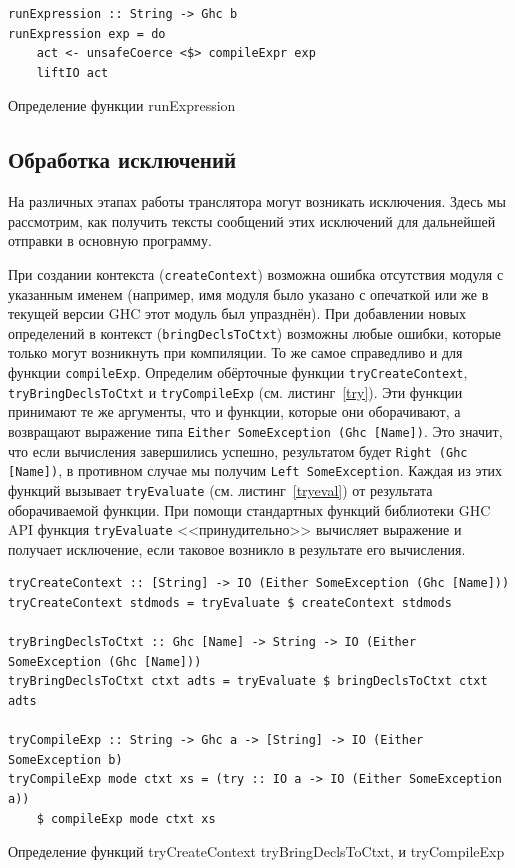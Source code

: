 \begin{ListingEnv}
	\begin{lstlisting}
runExpression :: String -> Ghc b
runExpression exp = do
    act <- unsafeCoerce <$> compileExpr exp
    liftIO act
	\end{lstlisting}
	\caption{Определение функции runExpression}\label{runexp}
\end{ListingEnv}
	
	\subsection{Обработка исключений}
	На различных этапах работы транслятора могут возникать исключения. Здесь мы рассмотрим, как получить тексты сообщений этих исключений для дальнейшей отправки в основную программу.
	
	При создании контекста (\lstinline!createContext!) возможна ошибка отсутствия модуля с указанным именем (например, имя модуля было указано с опечаткой или же в текущей версии GHC этот модуль был упразднён). При добавлении новых определений в контекст (\lstinline!bringDeclsToCtxt!) возможны любые ошибки, которые только могут возникнуть при компиляции. То же самое справедливо и для функции \lstinline!compileExp!. Определим обёрточные функции \lstinline!tryCreateContext!, \lstinline!tryBringDeclsToCtxt! и \lstinline!tryCompileExp! (см. листинг~\ref{try}). Эти функции принимают те же аргументы, что и функции, которые они оборачивают, а возвращают выражение типа \lstinline!Either SomeException (Ghc [Name])!. Это значит, что если вычисления завершились успешно, результатом будет \lstinline!Right (Ghc [Name])!, в противном случае мы получим \lstinline!Left SomeException!. Каждая из этих функций вызывает \lstinline!tryEvaluate! (см. листинг~\ref{tryeval}) от результата оборачиваемой функции. При помощи стандартных функций библиотеки GHC API функция \lstinline!tryEvaluate! <<принудительно>> вычисляет выражение и получает исключение, если таковое возникло в результате его вычисления.

\begin{ListingEnv}[h]
	\begin{lstlisting}
tryCreateContext :: [String] -> IO (Either SomeException (Ghc [Name]))
tryCreateContext stdmods = tryEvaluate $ createContext stdmods

tryBringDeclsToCtxt :: Ghc [Name] -> String -> IO (Either SomeException (Ghc [Name]))
tryBringDeclsToCtxt ctxt adts = tryEvaluate $ bringDeclsToCtxt ctxt adts

tryCompileExp :: String -> Ghc a -> [String] -> IO (Either SomeException b)
tryCompileExp mode ctxt xs = (try :: IO a -> IO (Either SomeException a))
	$ compileExp mode ctxt xs
	\end{lstlisting}
	\caption{Определение функций tryCreateContext tryBringDeclsToCtxt, и tryCompileExp}\label{try}
\end{ListingEnv}	

